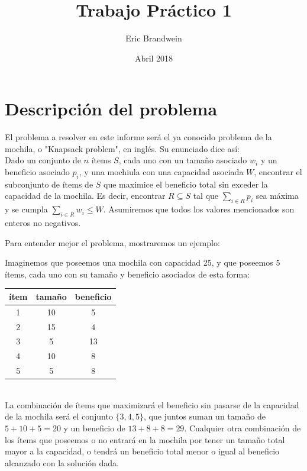\documentclass[10pt, a4paper]{article}
\title{Trabajo Pr\'actico 1}
\author{Eric Brandwein}
\date{Abril 2018}
\begin{document}
\maketitle

\tableofcontents

\pagebreak


\section{Descripci\'on del problema}

El problema a resolver en este informe será el ya conocido problema de la mochila, o "Knapsack problem", en inglés. Su enunciado dice así: \\
Dado un conjunto de $n$ ítems $S$, cada uno con un tamaño asociado $w_i$ y un beneficio asociado $p_i$, y una mochiula con una capacidad asociada $W$, encontrar el subconjunto de ítems de $S$ que maximice el beneficio total sin exceder la capacidad de la mochila. Es decir, encontrar $R \subseteq S$ tal que $\sum_{i \in R} p_i$ sea máxima y se cumpla $\sum_{i \in R} w_i \leq W$. Asumiremos que todos los valores mencionados son enteros no negativos.\par

Para entender mejor el problema, mostraremos un ejemplo: \par
Imaginemos que poseemos una mochila con capacidad 25, y que poseemos 5 ítems, cada uno con su tamaño y beneficio asociados de esta forma: \\
\begin{tabular}{c|c|c}
	ítem & tamaño & beneficio \\ \hline
	1 & 10 & 5 \\
	2 & 15 & 4 \\
	3 & 5 & 13 \\
	4 & 10 & 8 \\
	5 & 5 & 8
\end{tabular} \\
La combinación de ítems que maximizará el beneficio sin pasarse de la capacidad de la mochila será el conjunto $\{3, 4, 5\}$, que juntos suman un tamaño de $5 + 10 + 5 = 20$ y un beneficio de $13 + 8 + 8 = 29$. Cualquier otra combinación de los ítems que poseemos o no entrará en la mochila por tener un tamaño total mayor a la capacidad, o tendrá un beneficio total menor o igual al beneficio alcanzado con la solución dada. \par
\end{document}
